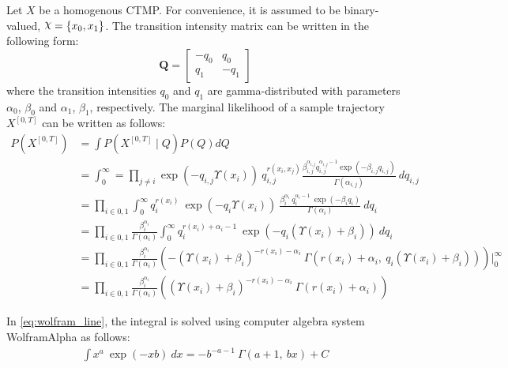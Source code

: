 Let $ X $ be a homogenous CTMP. For convenience, it is assumed to be binary-valued, $ \rchi = \left\lbrace x_{0}, x_{1} \right\rbrace $. The transition intensity matrix can be written in the following form:
\begin{equation}
\textbf{Q} = 
\begin{bmatrix}
-q_{0} & q_{0} \\
q_{1} & -q_{1}
\end{bmatrix}
\end{equation}
where the transition intensities $ q_{0} $ and $ q_{1} $ are gamma-distributed with parameters $ \alpha_{0}$, $ \beta_{0} $ and $ \alpha_{1} $, $ \beta_{1} $, respectively. The marginal likelihood of a sample trajectory $ X^{[0,T]} $ can be written as follows:
\begin{align}
P(X^{[0, T]}) & = \int  P(X^{[0, T]}\mid Q)P(Q) dQ \nonumber\\ 
& = \int_{0}^{\infty} = \prod_{j \neq i}  \exp(-q_{i,j}\Upsilon(x_{i}))\ q_{i,j}^{r(x_{i},x_{j})} \frac{\beta_{i,j}^{\alpha_{i,j}}{q_{i,j}^{\alpha_{i,j}-1}}\exp(-\beta_{i,j}q_{i,j})}{\Gamma(\alpha_{i,j})} \ dq_{i,j} \nonumber\\ 
& = \prod_{i\in{0,1}}\int_{0}^{\infty} q_{i}^{r(x_{i})} \ \exp(-q_{i}\Upsilon(x_{i})) \  \frac{\beta_{i}^{\alpha_{i}} \ q_{i}^{\alpha_{i}-1}\ \exp(-\beta_{i}q_{i})}{\Gamma(\alpha_{i})} \ dq_{i} \nonumber\\ 
& = \prod_{i\in{0,1}} \frac{\beta_{i}^{\alpha_{i}}}{\Gamma(\alpha_{i})} \int_{0}^{\infty} q_{i}^{r(x_{i}) + \alpha_{i} -1} \ \exp(-q_{i}(\Upsilon(x_{i})+\beta_{i})) \ dq_{i} \label{eq:wolfram_line}\\ 
& = \prod_{i\in{0,1}} \frac{\beta_{i}^{\alpha_{i}}}{\Gamma(\alpha_{i})} \left( -(\Upsilon(x_{i})+\beta_{i})^{-r(x_{i}) - \alpha_{i}}\ \Gamma(r(x_{i}) + \alpha_{i}, \ q_{i}(\Upsilon(x_{i})+\beta_{i})) \right) \Big|_0^\infty  \nonumber\\ 
& = \prod_{i\in{0,1}} \frac{\beta_{i}^{\alpha_{i}}}{\Gamma(\alpha_{i})} \left( (\Upsilon(x_{i})+\beta_{i})^{-r(x_{i}) - \alpha_{i}}\ \Gamma(r(x_{i}) + \alpha_{i}) \right)
\label{eq:Marg_traj}
\end{align}

In \autoref{eq:wolfram_line}, the integral is solved using computer algebra system WolframAlpha as follows:
\begin{align}
\int x^{a} \ \exp(-xb) \ dx = -b^{-a-1} \ \Gamma(a+1, \ bx) + C
\label{eq:integral}
\end{align}


